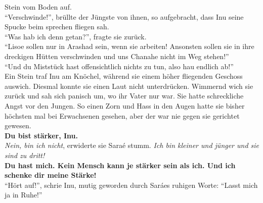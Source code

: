 \documentclass[a4paper,12pt]{book}
\begin{document}
Stein vom Boden auf. \\
``Verschwinde!'', brüllte der Jüngste von ihnen, so aufgebracht, dass Inu seine Spucke beim 
sprechen fliegen sah.\\
``Was hab ich denn getan?'', fragte sie zurück.\\
``Lisoe sollen nur in Arashad sein, wenn sie arbeiten! Ansonsten sollen sie in ihre dreckigen 
Hütten verschwinden und uns Chanahe nicht im Weg stehen!''\\
``Und du Miststück hast offensichtlich nichts zu tun, also hau endlich ab!''\\
Ein Stein traf Inu am Knöchel, während sie einem höher fliegenden Geschoss auswich. Diesmal konnte 
sie einen Laut nicht unterdrücken. Wimmernd wich sie zurück und sah sich panisch um, wo ihr Vater 
nur war. Sie hatte schreckliche Angst vor den Jungen. So einen Zorn und Hass in den Augen hatte sie 
bisher höchsten mal bei Erwachsenen gesehen, aber der war nie gegen sie gerichtet gewesen.\\
\textbf{Du bist stärker, Inu.}\\
\textit{Nein, bin ich nicht}, erwiderte sie Saraé stumm. \textit{Ich bin kleiner und jünger und sie 
sind zu dritt!}\\
\textbf{Du hast mich. Kein Mensch kann je stärker sein als ich. Und ich schenke dir meine Stärke!}\\
``Hört auf!'', schrie Inu, mutig geworden durch Saráes ruhigen Worte: ``Lasst mich ja in Ruhe!''\\
\end{document}
